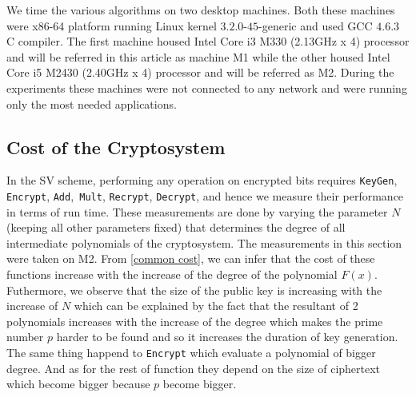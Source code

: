 \documentclass{acm_proc_article-sp}
\begin{document}
We time the various algorithms on two desktop machines. Both these machines were x86-64 platform running Linux kernel $3.2.0$-$45$-generic  and used GCC $4.6.3$ C compiler.  The first machine housed Intel Core i3 M330 (2.13GHz x 4) processor and will be referred in this article as machine M1 while the other housed Intel Core i5 M2430 (2.40GHz x 4) processor and will be referred as M2. During the experiments these machines were not connected to any network and were running only the most needed applications.
 
\subsection{Cost of the Cryptosystem}
 In the SV scheme, performing any operation on encrypted bits requires  \texttt{KeyGen}, \texttt{Encrypt}, \texttt{Add},\texttt{ Mult}, \texttt{Recrypt}, \texttt{Decrypt}, and hence we measure their performance in terms of run time. These measurements are done by varying the parameter $N$(keeping all other parameters fixed) that determines the degree of all intermediate polynomials of the cryptosystem. The measurements in this section were taken on M2. From \autoref{common cost}, we can infer that the cost of these functions increase with the increase of the degree of the polynomial $F(x)$. Futhermore, we observe that the size of the public key is increasing with the increase of $N$ which can be explained by the fact that the resultant of 2 polynomials increases with the increase of the degree which makes the prime number $p$ harder to be found and so it increases the duration of key generation. The same thing happend to \texttt{Encrypt} which evaluate a polynomial of bigger degree. And as for the rest of function they depend on the size of ciphertext which become bigger because $p$ become bigger.

\begin{table}[htb]
  \centering
  \caption{Run time (ms)}
\end{table}
\end{document}
